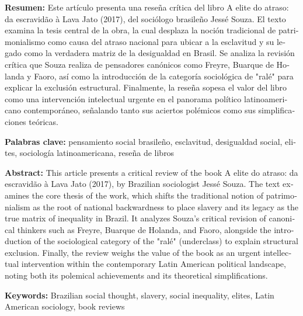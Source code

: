 \begin{tcolorbox}[colback=brown!8!white,colframe=brown!8!white,boxrule=0pt,arc=2pt,left=4pt,right=4pt,top=3pt,bottom=3pt,before skip=4pt,after skip=4pt]
\begin{otherlanguage}{spanish}
\sffamily\small \textbf{Resumen:} Este artículo presenta una reseña crítica del libro A elite do atraso: da escravidão à Lava Jato (2017), del sociólogo brasileño Jessé Souza. El texto examina la tesis central de la obra, la cual desplaza la noción tradicional de patrimonialismo como causa del atraso nacional para ubicar a la esclavitud y su legado como la verdadera matriz de la desigualdad en Brasil. Se analiza la revisión crítica que Souza realiza de pensadores canónicos como Freyre, Buarque de Holanda y Faoro, así como la introducción de la categoría sociológica de "ralé" para explicar la exclusión estructural. Finalmente, la reseña sopesa el valor del libro como una intervención intelectual urgente en el panorama político latinoamericano contemporáneo, señalando tanto sus aciertos polémicos como sus simplificaciones teóricas.
\par\smallskip\noindent\textbf{Palabras clave:} pensamiento social brasileño, esclavitud, desigualdad social, elites, sociología latinoamericana, reseña de libros
\end{otherlanguage}
\end{tcolorbox}

\begin{tcolorbox}[colback=brown!8!white,colframe=brown!8!white,boxrule=0pt,arc=2pt,left=4pt,right=4pt,top=3pt,bottom=3pt,before skip=4pt,after skip=4pt]
\begin{otherlanguage}{english}
\sffamily\small \textbf{Abstract:} This article presents a critical review of the book A elite do atraso: da escravidão à Lava Jato (2017), by Brazilian sociologist Jessé Souza. The text examines the core thesis of the work, which shifts the traditional notion of patrimonialism as the root of national backwardness to place slavery and its legacy as the true matrix of inequality in Brazil. It analyzes Souza's critical revision of canonical thinkers such as Freyre, Buarque de Holanda, and Faoro, alongside the introduction of the sociological category of the "ralé" (underclass) to explain structural exclusion. Finally, the review weighs the value of the book as an urgent intellectual intervention within the contemporary Latin American political landscape, noting both its polemical achievements and its theoretical simplifications.
\par\smallskip\noindent\textbf{Keywords:} Brazilian social thought, slavery, social inequality, elites, Latin American sociology, book reviews
\end{otherlanguage}
\end{tcolorbox}

